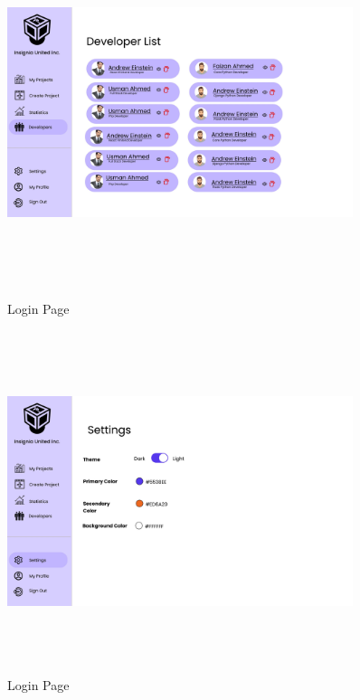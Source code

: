 \begin{figure}[H]
\includegraphics[height=10cm, width=0.9\textwidth]{./images/prototype/0005}
\centering 
\caption{Login Page}
\label{fig:prototype1}

\includegraphics[height=10cm, width=0.9\textwidth]{./images/prototype/0006}
\centering 
\caption{Login Page}
\label{fig:prototype1}
\end{figure}

